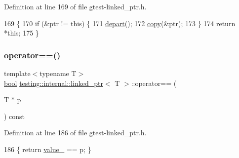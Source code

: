 Definition at line 169 of file gtest-\/linked\+\_\+ptr.\+h.


\begin{DoxyCode}
169                                                \{
170     \textcolor{keywordflow}{if} (&ptr != \textcolor{keyword}{this}) \{
171       \hyperlink{classtesting_1_1internal_1_1linked__ptr_a0852ab20839140f29b2ad074339fccc7}{depart}();
172       \hyperlink{classtesting_1_1internal_1_1linked__ptr_aea2859970b65708fc4f7c8c4cbc7928a}{copy}(&ptr);
173     \}
174     \textcolor{keywordflow}{return} *\textcolor{keyword}{this};
175   \}
\end{DoxyCode}
\mbox{\label{classtesting_1_1internal_1_1linked__ptr_ad87ac8ff5543b6fad66e2f3c9844581a}} 
\subsubsection{\texorpdfstring{operator==()}{operator==()}\hspace{0.1cm}{\footnotesize\ttfamily [1/2]}}
{\footnotesize\ttfamily template$<$typename T$>$ \\
\hyperlink{classbool}{bool} \hyperlink{classtesting_1_1internal_1_1linked__ptr}{testing\+::internal\+::linked\+\_\+ptr}$<$ T $>$\+::operator== (\begin{DoxyParamCaption}\item[{T $\ast$}]{p }\end{DoxyParamCaption}) const\hspace{0.3cm}{\ttfamily [inline]}}



Definition at line 186 of file gtest-\/linked\+\_\+ptr.\+h.


\begin{DoxyCode}
186 \{ \textcolor{keywordflow}{return} \hyperlink{classtesting_1_1internal_1_1linked__ptr_abb52c4e944fc7a24a4ec7788b612fb37}{value\_} == p; \}
\end{DoxyCode}
\mbox{\label{classtesting_1_1internal_1_1linked__ptr_a79306e959a4ae7b3a9da641d2ba06ce6}} 
